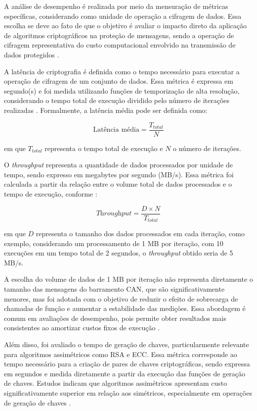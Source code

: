 A análise de desempenho é realizada por meio da mensuração de métricas específicas, considerando como unidade de operação a cifragem de dados. Essa escolha se deve ao fato de que o objetivo é avaliar o impacto direto da aplicação de algoritmos criptográficos na proteção de mensagens, sendo a operação de cifragem representativa do custo computacional envolvido na transmissão de dados protegidos \cite{gura2004comparing}.

A latência de criptografia é definida como o tempo necessário para executar a operação de cifragem de um conjunto de dados. Essa métrica é expressa em segundo(s) e foi medida utilizando funções de temporização de alta resolução, considerando o tempo total de execução dividido pelo número de iterações realizadas \cite{stankovic1996real}. Formalmente, a latência média pode ser definida como:

\[
\text{Latência média} = \frac{T_{total}}{N}
\]

em que $T_{total}$ representa o tempo total de execução e $N$ o número de iterações.

O \textit{throughput} representa a quantidade de dados processados por unidade de tempo, sendo expresso em megabytes por segundo (MB/s). Essa métrica foi calculada a partir da relação entre o volume total de dados processados e o tempo de execução, conforme \cite{tanenbaum1981network}:

\[
\textit{Throughput} = \frac{D \times N}{T_{total}}
\]

em que $D$ representa o tamanho dos dados processados em cada iteração, como exemplo, considerando um processamento de 1 MB por iteração, com 10 execuções em um tempo total de 2 segundos, o \textit{throughput} obtido seria de 5 MB/s.

A escolha do volume de dados de 1 MB por iteração não representa diretamente o tamanho das mensagens do barramento CAN, que são significativamente menores, mas foi adotada com o objetivo de reduzir o efeito de sobrecarga de chamadas de função e aumentar a estabilidade das medições. Essa abordagem é comum em avaliações de desempenho, pois permite obter resultados mais consistentes ao amortizar custos fixos de execução \cite{singh2024advanced}.

Além disso, foi avaliado o tempo de geração de chaves, particularmente relevante para algoritmos assimétricos como RSA e ECC. Essa métrica corresponde ao tempo necessário para a criação de pares de chaves criptográficas, sendo expressa em segundos e medida diretamente a partir da execução das funções de geração de chaves. Estudos indicam que algoritmos assimétricos apresentam custo significativamente superior em relação aos simétricos, especialmente em operações de geração de chaves \cite{gaubatz2004public}.

